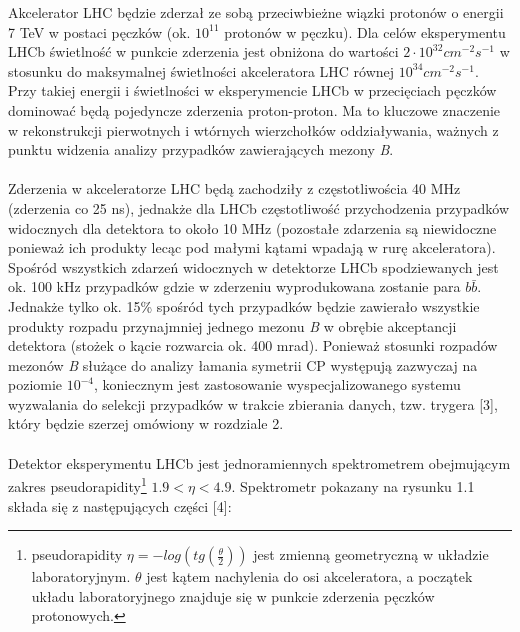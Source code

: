 \documentclass{pracamgr}
\begin{document}
\noindent
Akcelerator LHC będzie zderzał ze sobą przeciwbieżne wiązki protonów o energii 7 TeV w postaci pęczków (ok. $10^{11}$ protonów w pęczku). Dla celów eksperymentu LHCb świetlność w punkcie zderzenia jest obniżona do wartości $2\cdot 10^{32} cm^{-2}s^{-1}$ w stosunku do maksymalnej świetlności akceleratora LHC równej $10^{34} cm^{-2}s^{-1}$.  Przy takiej energii i świetlności w eksperymencie LHCb w przecięciach pęczków dominować będą pojedyncze zderzenia proton-proton. Ma to kluczowe znaczenie w rekonstrukcji pierwotnych i wtórnych wierzchołków oddziaływania, ważnych z punktu widzenia analizy przypadków zawierających mezony \textit{B}.
\\\\
\noindent
Zderzenia w akceleratorze LHC będą zachodziły z częstotliwościa 40 MHz (zderzenia co 25 ns), jednakże dla LHCb częstotliwość przychodzenia przypadków widocznych dla detektora to około 10 MHz (pozostałe zdarzenia są niewidoczne ponieważ ich produkty lecąc pod małymi kątami wpadają w rurę akceleratora). Spośród wszystkich zdarzeń widocznych w detektorze LHCb spodziewanych jest ok. 100 kHz przypadków gdzie w zderzeniu wyprodukowana zostanie para $b\bar{b}$. Jednakże tylko ok. 15\% spośród tych przypadków będzie zawierało wszystkie produkty rozpadu przynajmniej jednego mezonu \textit{B} w obrębie akceptancji detektora (stożek o kącie rozwarcia ok. 400 mrad). Ponieważ stosunki rozpadów mezonów \textit{B} służące do analizy łamania symetrii CP występują zazwyczaj na poziomie $10^{-4}$, koniecznym jest zastosowanie wyspecjalizowanego systemu wyzwalania do selekcji przypadków w trakcie zbierania danych, tzw. trygera [3], który będzie szerzej omówiony w rozdziale 2.
\\\\
\noindent
Detektor eksperymentu LHCb jest jednoramiennych spektrometrem obejmującym zakres pseudorapidity\footnote{pseudorapidity $\eta=-log(tg(\frac{\theta}{2}))$ jest zmienną geometryczną w układzie laboratoryjnym. $\theta$ jest kątem nachylenia do osi akceleratora, a początek układu laboratoryjnego znajduje się w punkcie zderzenia pęczków protonowych.} $1.9 < \eta < 4.9$. Spektrometr pokazany na rysunku 1.1 składa się z następujących części [4]:
\end{document}
